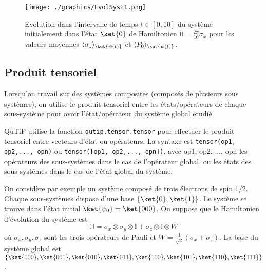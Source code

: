 \begin{figure}[htbp]
\centering
 \texttt{[image: ./graphics/EvolSyst1.png]}
 \caption{Evolution dans l'intervalle de temps $t\in[0,10]$ du système 
initialement dans l'état $\ket{0}$ de Hamiltonien $\mathtt{H} = 
\frac{2\pi}{10}\sigma_x$ pour les valeurs moyennes 
$\av{\sigma_z}_{\ket{\psi(t)}}$ et $\av{P_0}_{\ket{\psi(t)}}$.}
 \label{fig:EvolSyst1}
\end{figure}

\subsection{Produit tensoriel} 
\label{sec:tensor}

Lorsqu'on travail sur des systèmes composites (composés de plusieurs sous 
systèmes), on utilise le produit tensoriel entre les états/opérateurs de chaque 
sous-système pour avoir l'état/opérateur du système global étudié.

QuTiP utilise la fonction \texttt{qutip.tensor.tensor} pour effectuer le 
produit tensoriel entre vecteurs d'état ou opérateurs. La syntaxe est 
\texttt{tensor(op1, op2,..., opn)} ou \texttt{tensor([op1, op2,..., opn])}, 
avec op1, op2, ..., opn les opérateurs des sous-systèmes dans le cas 
de l'opérateur global, ou les états des sous-systèmes dans le cas de l'état 
global du système.

On considère par exemple un système composé de trois électrons de spin 1/2. 
Chaque sous-systèmes dispose d'une base $\{\ket{0},\ket{1}\}$. Le système se 
trouve dans l'état initial $\ket{\psi_0}=\ket{000}$. On suppose que le 
Hamiltonien d'évolution du système est 
\begin{equation}
\mathbb{H} = 
\sigma_x\otimes\sigma_y\otimes\mathbb{I}+\sigma_z\otimes\mathbb{I}\otimes W
\end{equation}
où $\sigma_x,\sigma_y,\sigma_z$ sont les trois opérateurs de Pauli et 
$W=\frac{1}{\sqrt{2}}(\sigma_x+\sigma_z)$. La base du système global est 
$\{\ket{000},\ket{001},\ket{010},\ket{011},\ket{100},\ket{101},\ket{110},\ket{
111}\}$.


